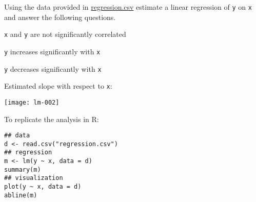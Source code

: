 
\begin{question}
Using the data provided in \url{regression.csv} estimate a linear regression of
\texttt{y} on \texttt{x} and answer the following questions.

\begin{answerlist}
  \item \texttt{x} and \texttt{y} are not significantly correlated
  \item \texttt{y} increases significantly with \texttt{x}
  \item \texttt{y} decreases significantly with \texttt{x}
  \item Estimated slope with respect to \texttt{x}:
\end{answerlist}
 
\end{question}

\begin{solution}
\texttt{[image: lm-002]}

To replicate the analysis in R:
\begin{verbatim}
## data
d <- read.csv("regression.csv")
## regression
m <- lm(y ~ x, data = d)
summary(m)
## visualization
plot(y ~ x, data = d)
abline(m)
\end{verbatim}

\end{solution}

